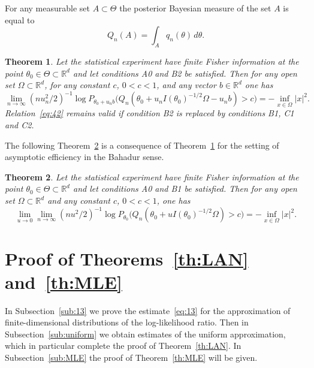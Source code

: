 \documentclass[11pt,a4paper]{article}
\newtheorem{theorem}{Theorem}[section]
\begin{document}
For any measurable set $A\subset\Theta$ the posterior Bayesian measure of the set $A$ is equal to
\begin{equation}
Q_n(A)=\int_A q_n(\theta)\,d\theta.
\label{eq:Qn}
\end{equation}

\begin{theorem}\label{th:posterior}
Let the statistical experiment have finite Fisher information at the point $\theta_0\in\Theta\subset\mathbb{R}^d$ and let conditions A0 and B2 be satisfied. Then for any open set $\Omega\subset\mathbb{R}^d$, for any constant $c$, $0<c<1$, and any vector $b\in\mathbb{R}^d$ one has
\begin{equation}
\lim_{n\to\infty}(nu_n^2/2)^{-1}\log P_{\theta_0+u_nb}\bigl(Q_n(\theta_0+u_n I(\theta_0)^{-1/2}\Omega-u_nb)>c\bigr)=-\inf_{x\in\Omega}|x|^2.
\label{eq:42}
\end{equation}
Relation~\eqref{eq:42} remains valid if condition B2 is replaced by conditions B1, C1 and C2.
\end{theorem}

The following Theorem~\ref{th:posterior-Bahadur} is a consequence of Theorem~\ref{th:posterior} for the setting of asymptotic efficiency in the Bahadur sense.

\begin{theorem}\label{th:posterior-Bahadur}
Let the statistical experiment have finite Fisher information at the point $\theta_0\in\Theta\subset\mathbb{R}^d$ and let conditions A0 and B1 be satisfied. Then for any open set $\Omega\subset\mathbb{R}^d$ and any constant $c$, $0<c<1$, one has
\begin{equation}
\lim_{u\to 0}\lim_{n\to\infty}(nu^2/2)^{-1}\log P_{\theta_0}\bigl(Q_n(\theta_0+u I(\theta_0)^{-1/2}\Omega)>c\bigr)=-\inf_{x\in\Omega}|x|^2.
\label{eq:43}
\end{equation}
\end{theorem}

\section{Proof of Theorems~\ref{th:LAN} and~\ref{th:MLE}}
\label{sec:proofs}

In Subsection~\ref{sub:13} we prove the estimate~\eqref{eq:13} for the approximation of finite-dimensional distributions of the log-likelihood ratio. Then in Subsection~\ref{sub:uniform} we obtain estimates of the uniform approximation, which in particular complete the proof of Theorem~\ref{th:LAN}. In Subsection~\ref{sub:MLE} the proof of Theorem~\ref{th:MLE} will be given.
\end{document}
